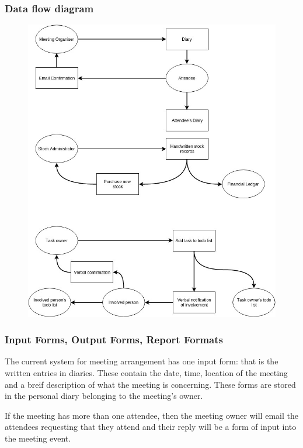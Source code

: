 \subsubsection{Data flow diagram}

\begin{figure}[H]
	\includegraphics[width=\textwidth]{./Analysis/diagrams/dfc.jpg}
\end{figure}

\subsubsection{Input Forms, Output Forms, Report Formats}

The current system for meeting arrangement has one input form: that is the written entries in diaries. These contain the date, time, location of the meeting and a breif description of what the meeting is concerning. These forms are stored in the personal diary belonging to the meeting's owner.

If the meeting has more than one attendee, then the meeting owner will email the attendees requesting that they attend and their reply will be a form of input into the meeting event.

